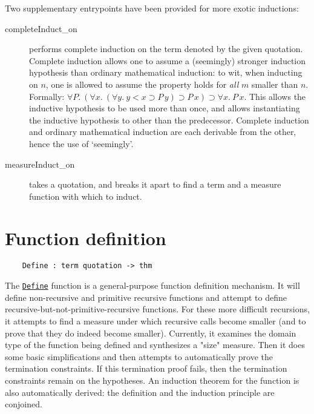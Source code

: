 \documentclass[12pt,fleqn,layout,a4paper]{report}
\begin{document}
Two supplementary entrypoints have been provided for more exotic
inductions:
\begin{description}
\item [completeInduct\_on] performs complete
induction on the term denoted by the given quotation. Complete induction allows one to assume a
(seemingly) stronger induction hypothesis than ordinary mathematical
induction: to wit, when inducting on
$n$, one is allowed to assume the property holds for {\it all\/} $m$
smaller than $n$. Formally: $\forall P.\ (\forall x.\ (\forall y.\ y < x
\supset P\, y) \supset P\,x) \supset \forall x.\ P\,x$. This allows the
inductive hypothesis to be used more than once, and allows instantiating
the inductive hypothesis to other than the predecessor. Complete
induction and ordinary mathematical induction are each derivable from
the other, hence the use of `seemingly'.
\item [measureInduct\_on] takes a quotation, and breaks it apart
to find a term and a measure function with which to induct.
\end{description}

\section{Function definition}

\begin{verbatim}
    Define : term quotation -> thm
\end{verbatim}

The \underline{\tt Define} function is a general-purpose function definition
mechanism. It will define non-recursive and primitive recursive
functions and attempt to define recursive-but-not-primitive-recursive
functions. For these more difficult recursions, it attempts to find a
measure under which recursive calls become smaller (and to prove that
they do indeed become smaller). Currently, it examines the domain type
of the function being defined and synthesizes a "size" measure.  Then it
does some basic simplifications and then attempts to automatically prove
the termination constraints.  If this termination proof fails, then the
termination constraints remain on the hypotheses. An induction theorem
for the function is also automatically derived: the definition and the
induction principle are conjoined.
\end{document}
